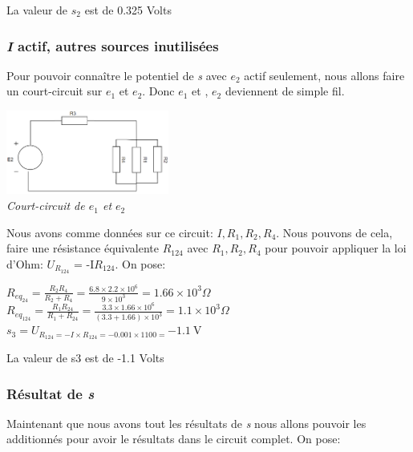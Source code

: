 \documentclass[a4paper,12pt,titlepage]{article}
\begin{document}
La valeur de $s_2$ est de 0.325 Volts

\subsubsection{\textit{I} actif, autres sources inutilisées}
Pour pouvoir connaître le potentiel de \textit{s} avec $e_2$ actif seulement, nous allons faire un court-circuit sur $e_1$ et $e_2$.
Donc  $e_1$ et , $e_2$ deviennent de simple fil.\\

\begin{center}
    \includegraphics[width=0.4\textwidth]{Exo1/Exo1-3.PNG}\\
    \textit{Court-circuit de $e_1$ et $e_2$}
\end{center}

Nous avons comme données sur ce circuit: $I, R_1, R_2, R_4$. Nous pouvons de cela, faire une résistance équivalente $R_{124}$ avec $R_1, R_2, R_4$ pour pouvoir appliquer la loi d'Ohm: $U_{R_{124}}$ = -I\times $R_{124}$. \newline On pose:\\

\begin{center}
$R_{eq_{24}} = \frac{R_2R_4}{R_2+R_4} = \frac{6.8\times2.2\times10^6}{9\times10^3} = 1.66\times10^3\Omega$\\

$R_{eq_{124}} = \frac{R_1R_24}{R_1+R_24} = \frac{3.3\times1.66\times10^6}{(3.3+1.66)\times10^3} = 1.1\times10^3\Omega$\\

$s_3 = U_{R_{124}= -I\times R_{124} = -0.001\times1100 = }\SI{-1.1}{\volt}$\\
\end{center}
La valeur de s3 est de -1.1 Volts
\subsubsection{Résultat de \textit{s}}


Maintenant que nous avons tout les résultats de \textit{s} nous allons pouvoir les additionnés pour avoir le résultats dans le circuit complet. On pose:\\
\end{document}
